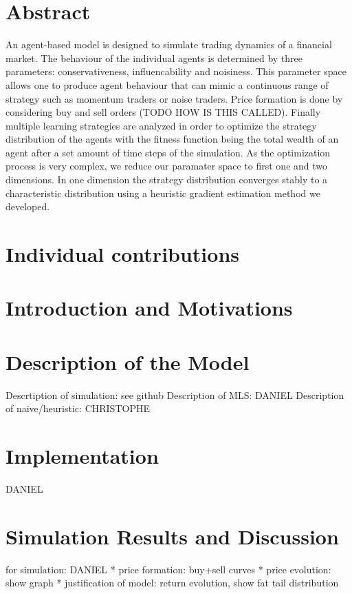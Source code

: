 \documentclass[11pt]{article}
\begin{document}
\section{Abstract}
An agent-based model is designed to simulate trading dynamics of a financial market. The behaviour of the individual agents is determined by three parameters: conservativeness, influencability and noisiness. This parameter space allows one to produce agent behaviour that can mimic a continuous range of strategy such as  momentum traders or noise traders. Price formation is done by considering buy and sell orders (TODO HOW IS THIS CALLED). Finally multiple learning strategies are analyzed in order to optimize the strategy distribution of the agents with the fitness function being the total wealth of an agent after a set amount of time steps of the simulation. As the optimization process is very complex, we reduce our paramater space to first one and two dimensions. In one dimension the strategy distribution converges stably to a characteristic distribution using a heuristic gradient estimation method we developed.

\section{Individual contributions}

\section{Introduction and Motivations}

\section{Description of the Model}
Descrtiption of simulation: see github
Description of MLS: DANIEL
Description of naive/heuristic: CHRISTOPHE

\section{Implementation}
DANIEL

\section{Simulation Results and Discussion}
for simulation: DANIEL
* price formation: buy+sell curves
* price evolution: show graph
* justification of model: return evolution, show fat tail distribution
\end{document}
